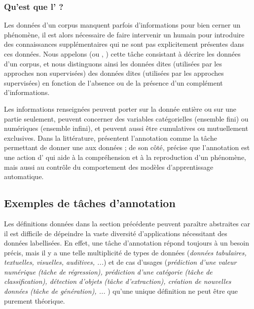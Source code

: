 		\subsubsection{Qu'est que l' ?}
		\label{section:2.1.1.C-PRESENTATION-ANNOTATION-DEFINITION-ANNOTATION}
			
			Les données d'un corpus manquent parfois d'informations pour bien cerner un phénomène, il est alors nécessaire de faire intervenir un humain pour introduire des connaissances supplémentaires qui ne sont pas explicitement présentes dans ces données.
			Nous appelons  (ou , ) cette tâche consistant à décrire les données d'un corpus, et nous distinguons ainsi les données dites  (utilisées par les approches non supervisées) des données dites  (utilisées par les approches supervisées) en fonction de l'absence ou de la présence d'un complément d'informations.
			
			Les informations renseignées peuvent porter sur la donnée entière ou sur une partie seulement, peuvent concerner des variables catégorielles (ensemble fini) ou numériques (ensemble infini), et peuvent aussi être cumulatives ou mutuellement exclusives.
			Dans la littérature, \cite{garside-etal:1997:corpus-annotation-linguistic} présentent l'annotation comme la tâche permettant de donner une  aux données ; de son côté, \cite{leech:2004:adding-linguistic-annotation} précise que l'annotation est une action d' qui aide à la compréhension et à la reproduction d'un phénomène, mais aussi au contrôle du comportement des modèles d'apprentissage automatique.
	
	
	\subsection{Exemples de tâches d'annotation}
	\label{section:2.1.2-PRESENTATION-ANNOTATION-EXEMPLES}
		
		Les définitions données dans la section précédente peuvent paraître abstraites car il est difficile de dépeindre la vaste diversité d'applications nécessitant des données labellisées.
		En effet, une tâche d'annotation répond toujours à un besoin précis, mais il y a une telle multiplicité de types de données (\textit{données tabulaires, textuelles, visuelles, auditives, ...}) et de cas d'usages (\textit{prédiction d'une valeur numérique (tâche de régression), prédiction d'une catégorie (tâche de classification), détection d'objets (tâche d'extraction), création de nouvelles données (tâche de génération), ... }) qu'une unique définition ne peut être que purement théorique.
		
